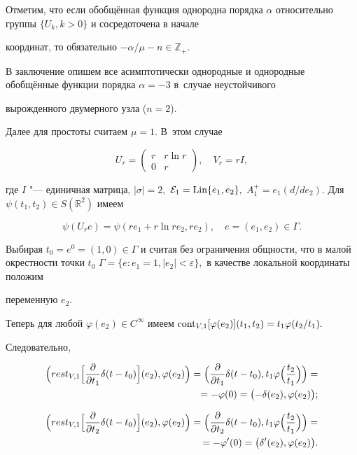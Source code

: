 \smallskip



Отметим, что если обобщённая функция однородна порядка $\alpha$ относительно группы $\{U_k, k>0\}$  и сосредоточена в начале

координат, то обязательно $-{\alpha}/{\mu}-n \in \mathbb Z_{+}.$



В заключение опишем все асимптотически однородные и однородные обобщённые функции порядка $\alpha =-3$ в~случае неустойчивого

вырожденного двумерного узла ($n=2$). 

Далее для простоты  считаем $\mu=1.$ В~этом случае

$$ U_r= \begin{pmatrix}

r& r\ln r \\

0 & r

\end{pmatrix},\quad  V_r=rI,$$

где $I$ "--- единичная матрица, $|\sigma|=2,$ ${\cal E}_1= {\rm Lin}\{e_1, e_2\},$ $A_1^{+}=e_1({d}/{de_2}).$ Для $\psi(t_1,t_2) \in S(\mathbb R^2)$ имеем

$$\psi(U_re)=\psi(re_1+r\ln r e_2,re_2),\quad e=(e_1,e_2) \in \Gamma.$$

Выбирая $t_0=e^0=(1, 0) \in \Gamma$ и считая без ограничения общности, что в малой окрестности точки $t_0$ $\Gamma=\{

e: e_1=1, |e_2|<\varepsilon\},$ в качестве локальной координаты положим

переменную $e_2.$ 

Теперь для любой $\varphi(e_2) \in C^{\infty}$ имеем ${\rm cont}_{V,1}[\varphi(e_2)](t_1,t_2)=t_1\varphi({t_2}/{t_1}).$

Следовательно,

\begin{multline*}

\Bigl(rest_{V,1}\Bigl[\frac{\partial}{\partial t_1}\delta (t-t_0)\Bigr](e_2), \varphi(e_2)\Bigr)=

\Bigl(\frac{\partial}{\partial t_1}\delta (t-t_0), t_1\varphi\Bigl( \frac{t_2}{t_1}\Bigr)\Bigr) = \hfill \\ 

\hfill=-\varphi(0)=\bigl(-\delta(e_2), \varphi(e_2)\bigr);

\end{multline*}

\begin{multline*}

\Bigl(rest_{V,1}\Bigl[\frac{\partial}{\partial t_2}\delta (t-t_0)\Bigr](e_2), \varphi(e_2)\Bigr)=

\Bigl(\frac{\partial}{\partial t_2}\delta (t-t_0), t_1\varphi\Bigl( \frac{t_2}{t_1}\Bigr)\Bigr)= \hfill\\

\hfill

=-\varphi'(0) =\bigl(\delta'(e_2),\varphi(e_2)\bigr).

\end{multline*}

